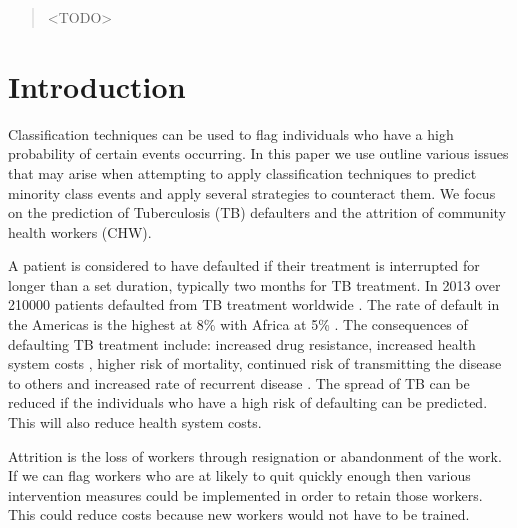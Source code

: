 \documentclass{sig-alternate-05-2015}
\begin{document}
	\maketitle
	\begin{abstract}
		<TODO>
	\end{abstract}
	
	\printccsdesc
	
	
	
	\section{Introduction}
	Classification techniques can be used to flag individuals who have a high probability of certain events occurring. In this paper we use outline various issues that may arise when attempting to apply classification techniques to predict minority class events and apply several strategies to counteract them. We focus on the prediction of Tuberculosis (TB) defaulters and the attrition of community health workers (CHW).
		
	A patient is considered to have defaulted if their treatment is interrupted for longer than a set duration, typically two months for TB treatment. In 2013 over 210\hspace*{1mm}000 patients defaulted from TB treatment worldwide \cite{world2015TB}. The rate of default in the Americas is the highest at 8\% with Africa at 5\% \cite{world2015TB}. The consequences of defaulting TB treatment include: increased drug resistance, increased health system costs \cite{Lackey:10356751520150601, muture:6660173120110101}, higher risk of mortality, continued risk of transmitting the disease to others \cite{Lackey:10356751520150601} and increased rate of recurrent disease \cite{Jha:10.1371/journal.pone.0008873}. The spread of TB can be reduced if the individuals who have a high risk of defaulting can be predicted. This will also reduce health system costs.
	
	Attrition is the loss of workers through resignation or abandonment of the work. If we can flag workers who are at likely to quit quickly enough then various intervention measures could be implemented in order to retain those workers. This could reduce costs because new workers would not have to be trained.
	
\end{document}
